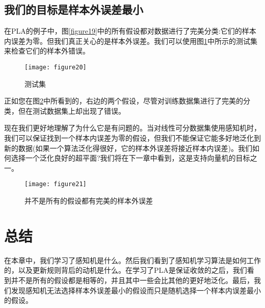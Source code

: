\subsection{我们的目标是样本外误差最小}

在PLA的例子中，图\ref{figure19}中的所有假设都对数据进行了完美分类:它们的样本内误差为零。但我们真正关心的是样本外误差。我们可以使用图\ref{figure20}中所示的测试集来检查它们的样本外错误。


\begin{figure}[ht]
    \centering
    \texttt{[image: figure20]}
    \caption{测试集}
    \label{figure20}
\end{figure}


正如您在图\ref{figure21}中所看到的，右边的两个假设，尽管对训练数据集进行了完美的分类，但在测试数据集上却出现了错误。

现在我们更好地理解了为什么它是有问题的。当对线性可分数据集使用感知机时，我们可以保证找到一个样本内误差为零的假设，但我们不能保证它能多好地泛化到新的数据(如果一个算法泛化得很好，它的样本外误差将接近样本内误差)。我们如何选择一个泛化良好的超平面?我们将在下一章中看到，这是支持向量机的目标之一。

\begin{figure}[ht]
    \centering
    \texttt{[image: figure21]}
    \caption{并不是所有的假设都有完美的样本外误差}
    \label{figure21}
\end{figure}

\section{总结}

在本章中，我们学习了感知机是什么。然后我们看到了感知机学习算法是如何工作的，以及更新规则背后的动机是什么。在学习了PLA是保证收敛的之后，我们看到并不是所有的假设都是相等的，并且其中一些会比其他的更好地泛化。最后，我们发现感知机无法选择样本外误差最小的假设而只是随机选择一个样本内误差最小的假设。